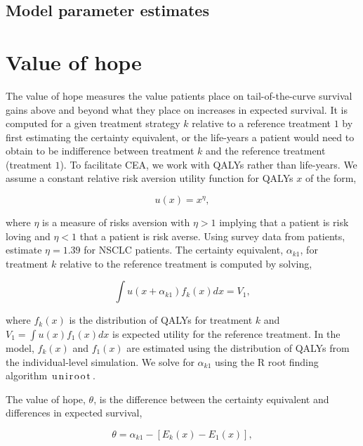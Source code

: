 \documentclass[11pt,final,fleqn]{article}\usepackage[]{graphicx}\usepackage[]{color}
\theoremstyle{plain}
\newcommand\R{{\textsf{R}}}
\begin{document}
\begin{appendices}
\begin{verbatim}
\end{verbatim}


\subsection{Model parameter estimates}



\section{Value of hope} \label{app:value-of-hope}
The value of hope measures the value patients place on tail-of-the-curve survival gains above and beyond what they place on increases in expected survival. It is computed for a given treatment strategy $k$ relative to a reference treatment $1$ by first estimating the certainty equivalent, or the life-years a patient would need to obtain to be indifference between treatment $k$ and the reference treatment (treatment $1$). To facilitate CEA, we work with QALYs rather than life-years. We assume a constant relative risk aversion utility function for QALYs $x$ of the form,

\begin{equation}\label{eqn:value-of-hope}
u(x) = x^\eta,
\end{equation}

where $\eta$ is a measure of risks aversion with $\eta > 1$ implying that a patient is risk loving and $\eta < 1$ that a patient is risk averse. Using survey data from patients, \citet{shafrin2017patient} estimate $\eta = 1.39$ for NSCLC patients. The certainty equivalent, $\alpha_{k1}$, for treatment $k$ relative to the reference treatment is computed by solving,

\begin{equation}
\int u(x + \alpha_{k1}) f_k(x) dx = V_1,
\end{equation}    

where $f_k(x)$ is the distribution of QALYs for treatment $k$ and $V_1 = \int u(x)f_1(x) dx$ is expected utility for the reference treatment. In the model, $f_k(x)$ and $f_1(x)$ are estimated using the distribution of QALYs from the individual-level simulation. We solve for $\alpha_{k1}$ using the \R{} root finding algorithm $\lstinline[columns=fixed]{uniroot}$. 

The value of hope, $\theta$, is the difference between the certainty equivalent and differences in expected survival,

\begin{equation}
\theta = \alpha_{k1} - \left[E_k(x) - E_1(x) \right],
\end{equation}     


\end{appendices}
\end{document}
